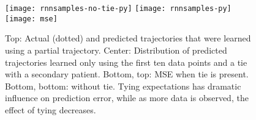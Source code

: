 
\begin{figure}[!htb]
	\centering
	\texttt{[image: rnnsamples-no-tie-py]}
	\texttt{[image: rnnsamples-py]}
	\texttt{[image: mse]}
		
		\caption{Top: Actual (dotted) and predicted trajectories that were learned using a partial trajectory. Center: Distribution of predicted trajectories learned only using the first ten data points and a tie with a secondary patient. Bottom, top: MSE when tie is present.  Bottom, bottom: without tie.  Tying expectations has dramatic influence on prediction error, while as more data is observed, the effect of tying decreases.}
		\label{fig:rnn-samples}
		\vspace{-1em}
\end{figure}




